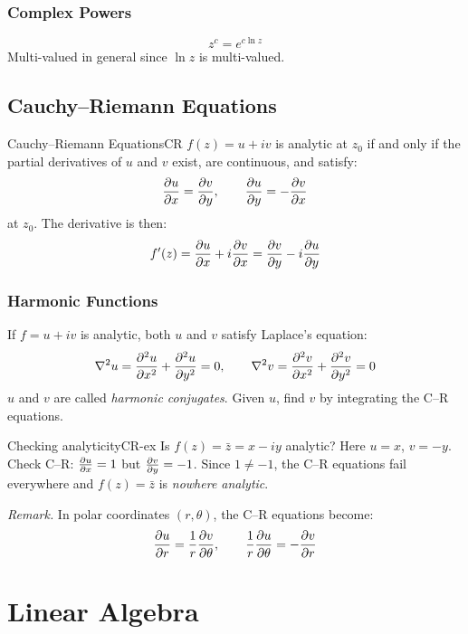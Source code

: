 \documentclass[11pt, letterpaper]{article}
\theoremstyle{plain}
\newenvironment{remark}{\smallskip\noindent\textit{Remark.}}{\smallskip}
\begin{document}
\subsubsection*{Complex Powers}
\[
    z^c = e^{c\ln z}
\]
Multi-valued in general since $\ln z$ is multi-valued.


\subsection{Cauchy--Riemann Equations}

\begin{theorem}{Cauchy--Riemann Equations}{CR}
    $f(z) = u + iv$ is analytic at $z_0$ if and only if the partial
    derivatives of $u$ and $v$ exist, are continuous, and satisfy:
    \[
        \pdv{u}{x} = \pdv{v}{y}, \qquad \pdv{u}{y} = -\pdv{v}{x}
    \]
    at $z_0$. The derivative is then:
    \[
        f'(z) = \pdv{u}{x} + i\pdv{v}{x} = \pdv{v}{y} - i\pdv{u}{y}
    \]
\end{theorem}

\subsubsection*{Harmonic Functions}
If $f = u + iv$ is analytic, both $u$ and $v$ satisfy Laplace's equation:
\[
    \nabla^2 u = \pdv[2]{u}{x} + \pdv[2]{u}{y} = 0, \qquad
    \nabla^2 v = \pdv[2]{v}{x} + \pdv[2]{v}{y} = 0
\]
$u$ and $v$ are called \emph{harmonic conjugates}.
Given $u$, find $v$ by integrating the C--R equations.

\begin{example}{Checking analyticity}{CR-ex}
    Is $f(z) = \bar{z} = x - iy$ analytic? Here $u = x$, $v = -y$.
    Check C--R: $\pdv{u}{x} = 1$ but $\pdv{v}{y} = -1$. Since $1\neq -1$,
    the C--R equations fail everywhere and $f(z) = \bar{z}$ is
    \emph{nowhere analytic}.
\end{example}

\begin{remark}
    In polar coordinates $(r,\theta)$, the C--R equations become:
    \[
        \pdv{u}{r} = \frac{1}{r}\pdv{v}{\theta}, \qquad
        \frac{1}{r}\pdv{u}{\theta} = -\pdv{v}{r}
    \]
\end{remark}

\newpage
\section{Linear Algebra}                       %
\end{document}
